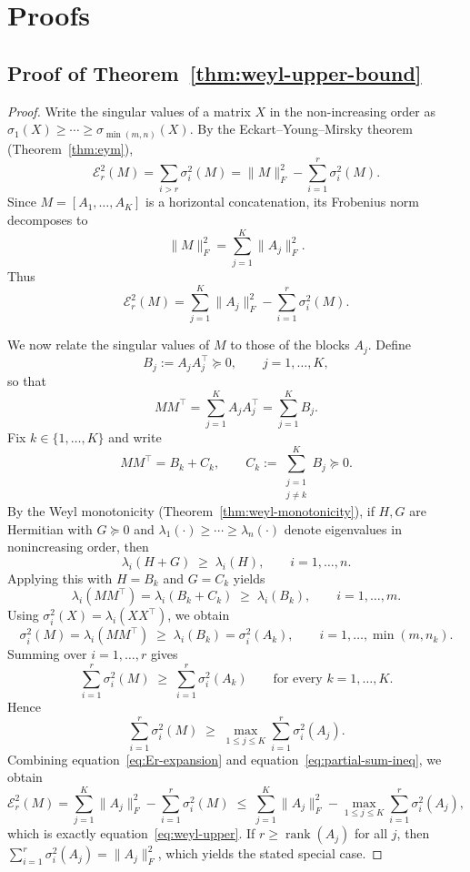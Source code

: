 \documentclass[10pt]{article} %
\def\eqref#1{equation~\ref{#1}}
\begin{document}
\section{Proofs}

\subsection{Proof of Theorem~\ref{thm:weyl-upper-bound}}
\label{appendix:proof-weyl}

\begin{proof}
Write the singular values of a matrix $X$ in the non-increasing order as
$\sigma_1(X)\ge \cdots \ge \sigma_{\min(m,n)}(X)$.
By the Eckart--Young--Mirsky theorem (Theorem~\ref{thm:eym}),
\[
  \mathcal{E}_r^2(M)
  = \sum_{i>r} \sigma_i^2(M)
  = \|M\|_F^2 - \sum_{i=1}^r \sigma_i^2(M).
\]
Since $M = [A_1,\dots,A_K]$ is a horizontal concatenation, its Frobenius norm
decomposes to
\[
  \|M\|_F^2 = \sum_{j=1}^K \|A_j\|_F^2.
\]
Thus
\begin{equation}
\label{eq:Er-expansion}
  \mathcal{E}_r^2(M)
  = \sum_{j=1}^K \|A_j\|_F^2
    - \sum_{i=1}^r \sigma_i^2(M).
\end{equation}

We now relate the singular values of $M$ to those of the blocks $A_j$.
Define
\[
  B_j := A_j A_j^\top \succeq 0, \qquad j=1,\dots,K,
\]
so that
\[
  MM^\top = \sum_{j=1}^K A_j A_j^\top = \sum_{j=1}^K B_j.
\]
Fix $k\in\{1,\dots,K\}$ and write
\[
  MM^\top = B_k + C_k,
  \qquad
  C_k := \sum_{\substack{j=1\\ j\neq k}}^K B_j \succeq 0.
\]
By the Weyl monotonicity (Theorem~\ref{thm:weyl-monotonicity}), if $H,G$ are
Hermitian with $G\succeq 0$ and
$\lambda_1(\cdot)\ge \cdots \ge \lambda_n(\cdot)$ denote eigenvalues in
nonincreasing order, then
\[
  \lambda_i(H+G) \;\ge\; \lambda_i(H),
  \qquad i=1,\dots,n.
\]
Applying this with $H = B_k$ and $G = C_k$ yields
\[
  \lambda_i(MM^\top) = \lambda_i(B_k + C_k)
  \;\ge\; \lambda_i(B_k),
  \qquad i=1,\dots,m.
\]
Using $\sigma_i^2(X) = \lambda_i(XX^\top)$, we obtain
\[
  \sigma_i^2(M)
  = \lambda_i(MM^\top)
  \;\ge\; \lambda_i(B_k)
  = \sigma_i^2(A_k),
  \qquad i=1,\dots,\min(m,n_k).
\]
Summing over $i=1,\dots,r$ gives
\[
  \sum_{i=1}^r \sigma_i^2(M)
  \;\ge\; \sum_{i=1}^r \sigma_i^2(A_k)
  \qquad\text{for every }k=1,\dots,K.
\]
Hence
\begin{equation}
\label{eq:partial-sum-ineq}
  \sum_{i=1}^r \sigma_i^2(M)
  \;\ge\; \max_{1\le j\le K} \sum_{i=1}^r \sigma_i^2(A_j).
\end{equation}
Combining \eqref{eq:Er-expansion} and \eqref{eq:partial-sum-ineq}, we obtain
\[
  \mathcal{E}_r^2(M)
  = \sum_{j=1}^K \|A_j\|_F^2
    - \sum_{i=1}^r \sigma_i^2(M)
  \;\le\;
  \sum_{j=1}^K \|A_j\|_F^2
    - \max_{1\le j\le K} \sum_{i=1}^r \sigma_i^2(A_j),
\]
which is exactly \eqref{eq:weyl-upper}.  
If $r \ge \operatorname{rank}(A_j)$ for all $j$, then
$\sum_{i=1}^r \sigma_i^2(A_j) = \|A_j\|_F^2$, which yields the stated 
special case.
\end{proof}
\end{document}
